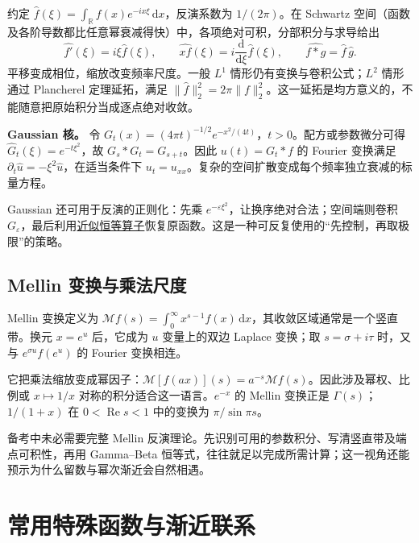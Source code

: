 \documentclass[12pt,fontset=fandol]{ctexart}
\begin{document}
\label{app:transform-fourier}

约定 $\widehat f(\xi)=\int_{\mathbb R}f(x)e^{-ix\xi}\,\mathrm dx$，反演系数为 $1/(2\pi)$。在 Schwartz 空间（函数及各阶导数都比任意幂衰减得快）中，各项绝对可积，分部积分与求导给出
\[
\widehat{f'}(\xi)=i\xi\widehat f(\xi),\qquad
\widehat{xf}(\xi)=i\frac{\mathrm d}{\mathrm d\xi}\widehat f(\xi),\qquad
\widehat{f*g}=\widehat f\,\widehat g.
\]
平移变成相位，缩放改变频率尺度。一般 $L^1$ 情形仍有变换与卷积公式；$L^2$ 情形通过 Plancherel 定理延拓，满足 $\|\widehat f\|_2^2=2\pi\|f\|_2^2$。这一延拓是均方意义的，不能随意把原始积分当成逐点绝对收敛。

\textbf{Gaussian 核。} 令 $G_t(x)=(4\pi t)^{-1/2}e^{-x^2/(4t)}$，$t>0$。配方或参数微分可得 $\widehat G_t(\xi)=e^{-t\xi^2}$，故 $G_s*G_t=G_{s+t}$。因此 $u(t)=G_t*f$ 的 Fourier 变换满足 $\partial_t\widehat u=-\xi^2\widehat u$，在适当条件下 $u_t=u_{xx}$。复杂的空间扩散变成每个频率独立衰减的标量方程。

Gaussian 还可用于反演的正则化：先乘 $e^{-\varepsilon\xi^2}$，让换序绝对合法；空间端则卷积 $G_\varepsilon$，最后利用\hyperref[app:integration-local]{近似恒等算子}恢复原函数。这是一种可反复使用的“先控制，再取极限”的策略。

\subsection{Mellin 变换与乘法尺度}

\label{app:transform-mellin}

Mellin 变换定义为 $\mathcal Mf(s)=\int_0^\infty x^{s-1}f(x)\,\mathrm dx$，其收敛区域通常是一个竖直带。换元 $x=e^u$ 后，它成为 $u$ 变量上的双边 Laplace 变换；取 $s=\sigma+i\tau$ 时，又与 $e^{\sigma u}f(e^u)$ 的 Fourier 变换相连。

它把乘法缩放变成幂因子：$\mathcal M[f(ax)](s)=a^{-s}\mathcal Mf(s)$。因此涉及幂权、比例或 $x\mapsto1/x$ 对称的积分适合这一语言。$e^{-x}$ 的 Mellin 变换正是 $\Gamma(s)$；$1/(1+x)$ 在 $0<\operatorname{Re}s<1$ 中的变换为 $\pi/\sin\pi s$。

备考中未必需要完整 Mellin 反演理论。先识别可用的参数积分、写清竖直带及端点可积性，再用 Gamma--Beta 恒等式，往往就足以完成所需计算；这一视角还能预示为什么留数与幂次渐近会自然相遇。



\section{常用特殊函数与渐近联系}
\end{document}

